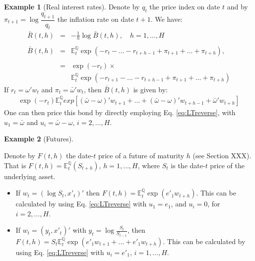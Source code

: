 \documentclass[
  12pt,
]{book}
\theoremstyle{definition}
\theoremstyle{definition}
\newtheorem{example}{Example}[chapter]
\theoremstyle{definition}
\theoremstyle{definition}
\theoremstyle{remark}
\begin{document}
\begin{example}[Real interest rates]
\protect\hypertarget{exm:realBth}{}\label{exm:realBth}Denote by \(q_t\) the price index on date \(t\) and by \(\pi_{t+1} = \log \dfrac{q_{t+1}}{q_t}\) the inflation rate on date \(t+1\). We have:
\begin{eqnarray*}
\bar{R}(t,h) & =& -   \frac{1}{h}   \log   \bar{B}(t,h), \quad h=1,\dots,H \\    \\
\bar{B}(t,h) & =&  \mathbb{E}^{\mathbb{Q}}_t   \exp(-r_{t}-\dots-r_{t+h-1} + \pi_{t+1}+\dots+\pi_{t+h}),  \\      \\
& =& \exp(-r_{t}) \times \\
&& \mathbb{E}^{\mathbb{Q}}_t \exp(-r_{t+1}-\dots-r_{t+h-1}+\pi_{t+1}+\dots+\pi_{t+h})
\end{eqnarray*}
If \(r_t = \omega'w_t\) and \(\pi_t = \bar\omega'w_t\), then \(\bar{B}(t,h)\) is given by:
\begin{eqnarray*}
\exp(-r_{t}) \mathbb{E}^{\mathbb{Q}}_t exp[(\bar\omega-\omega)'w_{t+1}+\dots+(\bar\omega-\omega)'w_{t+h-1}+\bar\omega'
w_{t+h}]
\end{eqnarray*}
One can then price this bond by directly employing Eq. \eqref{eq:LTreverse}, with \(u_1 = \bar\omega\) and \(u_i = \bar\omega-\omega\), \(i = 2,\dots, H\).
\end{example}

\begin{example}[Futures]
\protect\hypertarget{exm:Futures}{}\label{exm:Futures}

Denote by \(F(t,h)\) the date-\(t\) price of a future of maturity \(h\) (see Section XXX). That is \(F(t,h) = \mathbb{E}^{\mathbb{Q}}_t (S_{t+h})\), \(h=1,\dots,H\), where \(S_t\) is the date-\(t\) price of the underlying asset.

\begin{itemize}
\item
  If \(w_t = (\log S_t, x'_t)'\) then \(F(t,h) = \mathbb{E}^{\mathbb{Q}}_t \exp(e'_1 w_{t+h})\). This can be calculated by using Eq. \eqref{eq:LTreverse} with \(u_1 = e_1\), and \(u_i = 0\), for \(i=2,\dots,H\).
\item
  If \(w_t = (y_t, x'_t)'\) with \(y_t = \log\frac{S_t}{S_{t-1}}\), then \(F(t,h) = S_t \mathbb{E}^{\mathbb{Q}}_t \exp(e'_1 w_{t+1}+\dots+e'_1 w_{t+h})\). This can be calculated by using Eq. \eqref{eq:LTreverse} with \(u_i = e'_1\), \(i=1,\dots,H\).
\end{itemize}

\end{example}
\end{document}
